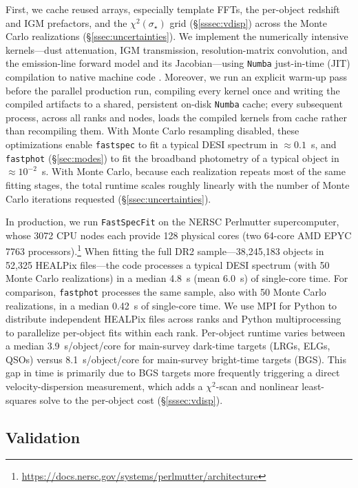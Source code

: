 \documentclass[modern,linenumbers]{aastex702}
\newcommand{\fastspecfit}{\texttt{FastSpecFit}}
\newcommand{\fastspec}{\texttt{fastspec}}
\newcommand{\fastphot}{\texttt{fastphot}}
\newcommand{\vdisp}{\ensuremath{\sigma_\star}}
\begin{document}
First, we cache reused arrays, especially template FFTs, the
per-object redshift and IGM prefactors, and the $\chi^2(\vdisp)$ grid
(\S\ref{sssec:vdisp}) across the Monte Carlo realizations
(\S\ref{ssec:uncertainties}). We implement the numerically intensive
kernels---dust attenuation, IGM transmission, resolution-matrix
convolution, and the emission-line forward model and its
Jacobian---using \texttt{Numba} just-in-time (JIT) compilation to
native machine code \citep{lam15a}. Moreover, we run an explicit
warm-up pass before the parallel production run, compiling every
kernel once and writing the compiled artifacts to a shared, persistent
on-disk \texttt{Numba} cache; every subsequent process, across all
ranks and nodes, loads the compiled kernels from cache rather than
recompiling them. With Monte Carlo resampling disabled, these
optimizations enable \fastspec{} to fit a typical DESI spectrum in
$\approx0.1$~s, and \fastphot{} (\S\ref{sec:modes}) to fit the
broadband photometry of a typical object in $\approx10^{-2}$~s. With
Monte Carlo,
because each realization repeats most of the same fitting stages, the
total runtime scales roughly linearly with the number of Monte Carlo
iterations requested (\S\ref{ssec:uncertainties}).

In production, we run \fastspecfit{} on the NERSC Perlmutter
supercomputer, whose 3072 CPU nodes each provide 128 physical cores
(two 64-core AMD EPYC 7763
processors).\footnote{\url{https://docs.nersc.gov/systems/perlmutter/architecture}}
When fitting the full DR2 sample---38,245,183 objects in 52,325 HEALPix
files---the code processes a typical DESI spectrum (with 50 Monte
Carlo realizations) in a median 4.8~s (mean 6.0~s) of single-core
time. For comparison, \fastphot{} processes the same sample, also with
50 Monte Carlo realizations, in a median 0.42~s of single-core time.
We use MPI for Python \citep[\texttt{mpi4py};][]{dalcin21a} to
distribute independent HEALPix files across ranks and Python
multiprocessing to parallelize per-object fits within each rank.
Per-object runtime varies between a median 3.9~s/object/core for
main-survey dark-time targets (LRGs, ELGs, QSOs) versus
8.1~s/object/core for main-survey bright-time targets (BGS). This gap
in time is primarily due to BGS targets more frequently triggering a
direct velocity-dispersion measurement, which adds a $\chi^2$-scan and
nonlinear least-squares solve to the per-object cost
(\S\ref{sssec:vdisp}).

\subsection{Validation}
\label{ssec:validation}
\end{document}
